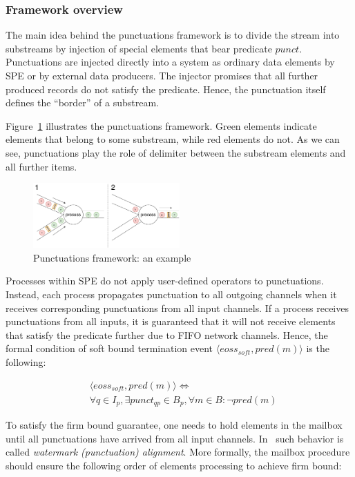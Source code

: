 \subsubsection{Framework overview}

The main idea behind the punctuations framework is to divide the stream into substreams by injection of special elements that bear predicate $punct$. Punctuations are injected directly into a system as ordinary data elements by SPE or by external data producers. The injector promises that all further produced records do not satisfy the predicate. Hence, the punctuation itself defines the ``border'' of a substream.

Figure~\ref{punctuations_scheme} illustrates the punctuations framework. Green elements indicate elements that belong to some substream, while red elements do not. As we can see, punctuations play the role of delimiter between the substream elements and all further items.

\begin{figure}[htbp]
  \centering
  \includegraphics[width=0.50\textwidth]{pics/punctuations-scheme.pdf}
  \caption{Punctuations framework: an example}
  \label{punctuations_scheme}
\end{figure}

Processes within SPE do not apply user-defined operators to punctuations. Instead, each process propagates punctuation to all outgoing channels when it receives corresponding punctuations from all input channels. If a process receives punctuations from all inputs, it is guaranteed that it will not receive elements that satisfy the predicate further due to FIFO network channels. Hence, the formal condition of soft bound termination event $\langle eoss_{soft}, pred(m)\rangle$ is the following:

\begin{align*}
& \langle eoss_{soft}, pred(m)\rangle \Longleftrightarrow \\ 
& \forall q \in I_p, \exists punct_{qp} \in B_p, \forall m\in B : \neg pred(m)
\end{align*}

To satisfy the firm bound guarantee, one needs to hold elements in the mailbox until all punctuations have arrived from all input channels. In~\cite{Carbone:2017:SMA:3137765.3137777} such behavior is called {\em watermark (punctuation) alignment}. More formally, the mailbox procedure should ensure the following order of elements processing to achieve firm bound:

